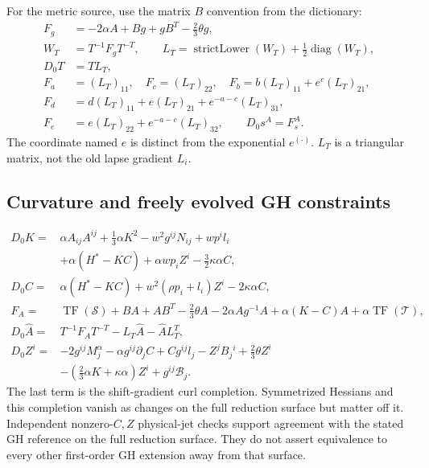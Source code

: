 \documentclass[11pt,letterpaper]{article}
\newcommand{\D}{D_0}\newcommand{\TF}{\operatorname{TF}}\newcommand{\tr}{\operatorname{tr}}
\begin{document}
For the metric source, use the matrix $B$ convention from the dictionary:
\begin{align}
F_g&=-2\alpha A+Bg+gB^T-\tfrac23\theta g,\\
W_T&=T^{-1}F_gT^{-T},\qquad
L_T=\operatorname{strictLower}(W_T)+\tfrac12\operatorname{diag}(W_T),\\
\D T&=TL_T,\\
F_a&=(L_T)_{11},\quad F_c=(L_T)_{22},\quad
F_b=b(L_T)_{11}+e^c(L_T)_{21},\\
F_d&=d(L_T)_{11}+e(L_T)_{21}+e^{-a-c}(L_T)_{31},\\
F_e&=e(L_T)_{22}+e^{-a-c}(L_T)_{32},\qquad \D s^A=F_s^A.
\end{align}
The coordinate named $e$ is distinct from the exponential $e^{(\cdot)}$. $L_T$ is a triangular matrix, not the old lapse gradient $L_i$.

\subsection{Curvature and freely evolved GH constraints}
\begin{align}
\D K={}&\alpha A_{ij}A^{ij}+\tfrac13\alpha K^2-w^2g^{ij}N_{ij}+wp^il_i\nonumber\\
&+\alpha(H^*-KC)+\alpha wp_iZ^i-\tfrac32\kappa\alpha C,\\
\D C={}&\alpha(H^*-KC)+w^2(\rho p_i+l_i)Z^i-2\kappa\alpha C,\\
F_A={}&\TF(\mathcal S)+BA+AB^T-\tfrac23\theta A
-2\alpha Ag^{-1}A+\alpha(K-C)A+\alpha\TF(\mathcal T),\\
\D\widehat A={}&T^{-1}F_AT^{-T}-L_T\widehat A-\widehat AL_T^T,\\
\D Z^i={}&-2g^{ij}M_j^\alpha-\alpha g^{ij}\partial_jC+Cg^{ij}l_j
-Z^jB_j{}^i+\tfrac23\theta Z^i\nonumber\\
&-\left(\tfrac23\alpha K+\kappa\alpha\right)Z^i+g^{ij}\mathcal B_j.
\end{align}
The last term is the shift-gradient curl completion. Symmetrized Hessians and this completion vanish as changes on the full reduction surface but matter off it. Independent nonzero-$C,Z$ physical-jet checks support agreement with the stated GH reference on the full reduction surface. They do not assert equivalence to every other first-order GH extension away from that surface.
\end{document}
